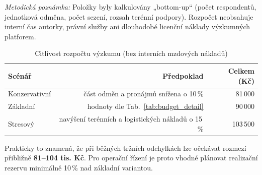 \textit{Metodická poznámka:} Položky byly kalkulovány „bottom-up“ (počet respondentů, jednotková odměna, počet sezení, rozsah terénní podpory). Rozpočet neobsahuje interní čas autorky, právní služby ani dlouhodobé licenční náklady výzkumných platforem.

\begin{table}[H]
\centering
\caption{Citlivost rozpočtu výzkumu (bez interních mzdových nákladů)}
\label{tab:budget_sensitivity}
\begin{tabular}{lrr}
\toprule
\textbf{Scénář} & \textbf{Předpoklad} & \textbf{Celkem (Kč)} \\
\midrule
Konzervativní & část odměn a pronájmů snížena o 10\,\% & 81\,000 \\
Základní & hodnoty dle Tab.\ \ref{tab:budget_detail} & 90\,000 \\
Stresový & navýšení terénních a logistických nákladů o 15\,\% & 103\,500 \\
\bottomrule
\end{tabular}
\end{table}

Prakticky to znamená, že při běžných tržních odchylkách lze očekávat rozmezí přibližně \textbf{81--104 tis. Kč}. Pro operační řízení je proto vhodné plánovat realizační rezervu minimálně 10\,\% nad základní variantou.
